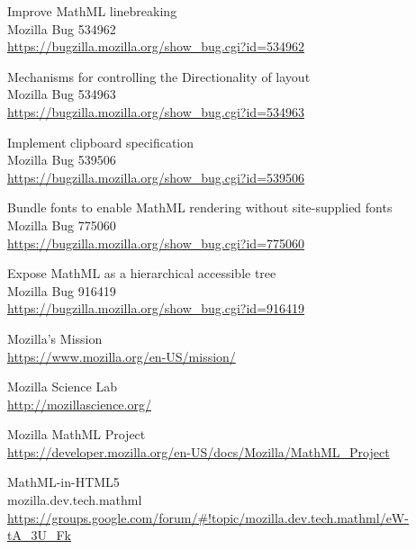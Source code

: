 \begin{thebibliography}{7}

Improve MathML linebreaking  \\
Mozilla Bug 534962 \\
\href{https://bugzilla.mozilla.org/show_bug.cgi?id=534962}{https://bugzilla.mozilla.org/show\_bug.cgi?id=534962}

Mechanisms for controlling the Directionality of layout \\
Mozilla Bug 534963 \\
\href{https://bugzilla.mozilla.org/show_bug.cgi?id=534963}{https://bugzilla.mozilla.org/show\_bug.cgi?id=534963}

Implement clipboard specification \\
Mozilla Bug 539506 \\
\href{https://bugzilla.mozilla.org/show_bug.cgi?id=539506}{https://bugzilla.mozilla.org/show\_bug.cgi?id=539506}

 Bundle fonts to enable MathML rendering without site-supplied fonts \\
Mozilla Bug 775060 \\
\href{https://bugzilla.mozilla.org/show_bug.cgi?id=775060}{https://bugzilla.mozilla.org/show\_bug.cgi?id=775060}

Expose MathML as a hierarchical accessible tree \\
Mozilla Bug 916419 \\
\href{https://bugzilla.mozilla.org/show_bug.cgi?id=916419}{https://bugzilla.mozilla.org/show\_bug.cgi?id=916419}

Mozilla's Mission \\
\href{https://www.mozilla.org/en-US/mission/}{https://www.mozilla.org/en-US/mission/}

Mozilla Science Lab \\
\href{http://mozillascience.org/}{http://mozillascience.org/}

Mozilla MathML Project \\
\href{https://developer.mozilla.org/en-US/docs/Mozilla/MathML_Project}{https://developer.mozilla.org/en-US/docs/Mozilla/MathML\_Project}

MathML-in-HTML5 \\
mozilla.dev.tech.mathml \\
\href{https://groups.google.com/forum/#!topic/mozilla.dev.tech.mathml/eW-tA_3U_Fk}{https://groups.google.com/forum/\#!topic/mozilla.dev.tech.mathml/eW-tA\_3U\_Fk}


\end{thebibliography}
